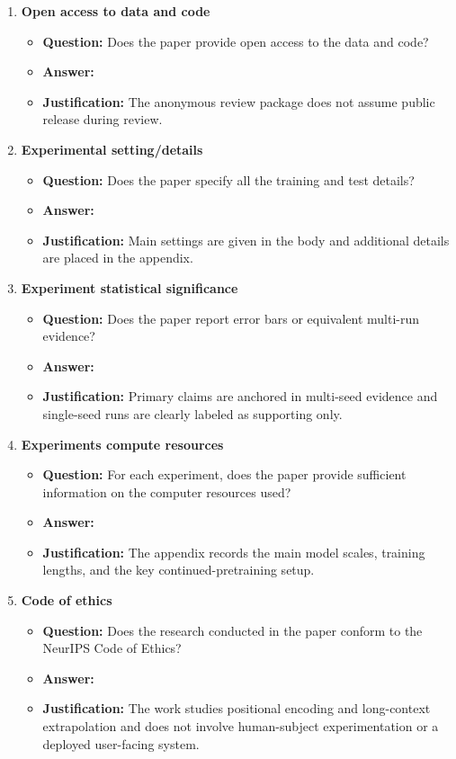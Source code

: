 \documentclass{article}
\begin{document}
\begin{enumerate}
\item \textbf{Open access to data and code}
\begin{itemize}
\item \textbf{Question:} Does the paper provide open access to the data and code?
\item \textbf{Answer:} \answerNo{}
\item \textbf{Justification:} The anonymous review package does not assume public release during review.
\end{itemize}

\item \textbf{Experimental setting/details}
\begin{itemize}
\item \textbf{Question:} Does the paper specify all the training and test details?
\item \textbf{Answer:} \answerYes{}
\item \textbf{Justification:} Main settings are given in the body and additional details are placed in the appendix.
\end{itemize}

\item \textbf{Experiment statistical significance}
\begin{itemize}
\item \textbf{Question:} Does the paper report error bars or equivalent multi-run evidence?
\item \textbf{Answer:} \answerYes{}
\item \textbf{Justification:} Primary claims are anchored in multi-seed evidence and single-seed runs are clearly labeled as supporting only.
\end{itemize}

\item \textbf{Experiments compute resources}
\begin{itemize}
\item \textbf{Question:} For each experiment, does the paper provide sufficient information on the computer resources used?
\item \textbf{Answer:} \answerYes{}
\item \textbf{Justification:} The appendix records the main model scales, training lengths, and the key continued-pretraining setup.
\end{itemize}

\item \textbf{Code of ethics}
\begin{itemize}
\item \textbf{Question:} Does the research conducted in the paper conform to the NeurIPS Code of Ethics?
\item \textbf{Answer:} \answerYes{}
\item \textbf{Justification:} The work studies positional encoding and long-context extrapolation and does not involve human-subject experimentation or a deployed user-facing system.
\end{itemize}


\end{enumerate}
\end{document}
